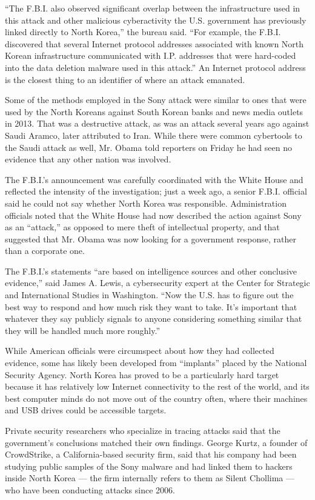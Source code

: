 ``The F.B.I. also observed significant overlap between the
infrastructure used in this attack and other malicious cyberactivity the
U.S. government has previously linked directly to North Korea,'' the
bureau said. ``For example, the F.B.I. discovered that several Internet
protocol addresses associated with known North Korean infrastructure
communicated with I.P. addresses that were hard-coded into the data
deletion malware used in this attack.'' An Internet protocol address is
the closest thing to an identifier of where an attack emanated.

Some of the methods employed in the Sony attack were similar to ones
that were used by the North Koreans against South Korean banks and news
media outlets in 2013. That was a destructive attack, as was an attack
several years ago against Saudi Aramco, later attributed to Iran. While
there were common cybertools to the Saudi attack as well, Mr. Obama told
reporters on Friday he had seen no evidence that any other nation was
involved.

The F.B.I.'s announcement was carefully coordinated with the White House
and reflected the intensity of the investigation; just a week ago, a
senior F.B.I. official said he could not say whether North Korea was
responsible. Administration officials noted that the White House had now
described the action against Sony as an ``attack,'' as opposed to mere
theft of intellectual property, and that suggested that Mr. Obama was
now looking for a government response, rather than a corporate one.

The F.B.I.'s statements ``are based on intelligence sources and other
conclusive evidence,'' said James A. Lewis, a cybersecurity expert at
the Center for Strategic and International Studies in Washington. ``Now
the U.S. has to figure out the best way to respond and how much risk
they want to take. It's important that whatever they say publicly
signals to anyone considering something similar that they will be
handled much more roughly.''

While American officials were circumspect about how they had collected
evidence, some has likely been developed from ``implants'' placed by the
National Security Agency. North Korea has proved to be a particularly
hard target because it has relatively low Internet connectivity to the
rest of the world, and its best computer minds do not move out of the
country often, where their machines and USB drives could be accessible
targets.

Private security researchers who specialize in tracing attacks said that
the government's conclusions matched their own findings. George Kurtz, a
founder of CrowdStrike, a California-based security firm, said that his
company had been studying public samples of the Sony malware and had
linked them to hackers inside North Korea --- the firm internally refers
to them as Silent Chollima --- who have been conducting attacks since
2006.

